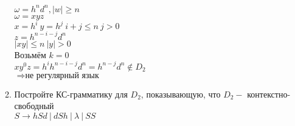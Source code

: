\documentclass{article}
\begin{document}
\begin{enumerate}
\begin{enumerate}
                        \begin{center}
                            $\omega = h^n d^n, |w| \geq n$ \\
                            $\omega = xyz$ \\
                            $x = h^i \  y = h^j \  i + j \leq n \  j > 0$ \\
                            $z = h^{n-i-j} d^n$ \\
                            $|xy| \leq n \  |y| > 0$ \\
                            Возьмём $k = 0$ \\
                            $xy^0z = h^i h^{n-i-j} d^n = h^{n-j} d^n \notin D_2$ \\
                            $\Rightarrow \textbf{не регулярный язык}$
                        \end{center}
                    
                    \item Постройте КС-грамматику для $D_2$, показывающую, что $D_2 - $ контекстно-свободный \\
                    
                    $S \rightarrow hSd \ | \ dSh \ | \ \lambda \ | \ SS$ \\
                \end{enumerate}
                
        \end{enumerate}
        
\end{document}
